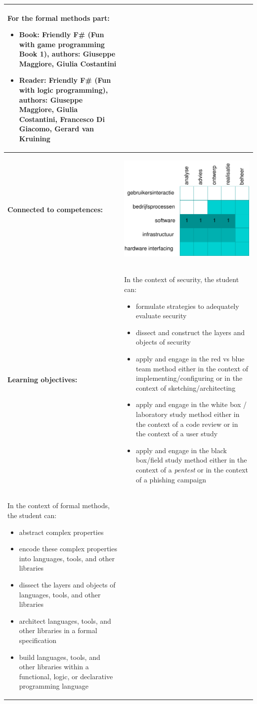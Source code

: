 \begin{tabularx}{\textwidth}{|>{\columncolor{lichtGrijs}} p{}|X|}
		For the formal methods part:
		\begin{itemize}
			\item Book: Friendly F\# (Fun with game programming Book 1), authors: Giuseppe Maggiore, Giulia Costantini
			\item Reader: Friendly F\# (Fun with logic programming), authors: Giuseppe Maggiore, Giulia Costantini, Francesco Di Giacomo, Gerard van Kruining
		\end{itemize} \\
	\hline
	\textbf{Connected to \newline competences:} &
	\begin{center}
		\includegraphics[width=7cm]{img/comptabel.pdf}
	\end{center}\\
	\hline
	\textbf{Learning objectives:}&
	In the context of security, the student can:
	\begin{itemize}
		\item formulate strategies to adequately evaluate security
		\item dissect and construct the layers and objects of security
		\item apply and engage in the red vs blue team method either in the context of implementing/configuring or in the context of sketching/architecting
		\item apply and engage in the white box / laboratory study method either in the context of a code review or in the context of a user study
		\item apply and engage in the black box/field study method either in the context of a \textit{pentest} or in the context of a phishing campaign
	\end{itemize} \\

	In the context of formal methods, the student can:
	\begin{itemize}
		\item abstract complex properties
		\item encode these complex properties into languages, tools, and other libraries
		\item dissect the layers and objects of languages, tools, and other libraries
		\item architect languages, tools, and other libraries in a formal specification
		\item build languages, tools, and other libraries within a functional, logic, or declarative programming language
	\end{itemize} \\
	\hline
\end{tabularx}
\newpage

